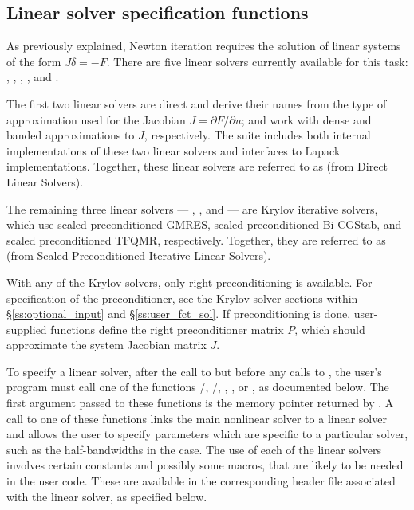 
\subsection{Linear solver specification functions}\label{sss:lin_solv_init}

As previously explained, Newton iteration requires the solution of
linear systems of the form $J\delta = -F$. There are five {\kinsol} linear
solvers currently available for this task: {\kindense}, {\kinband}, {\kinspgmr},
{\kinspbcg}, and {\kinsptfqmr}.

The first two linear solvers are direct and derive their names from the
type of approximation used for the Jacobian $J = \partial{F}/\partial{u}$;
{\kindense} and {\kinband} work with dense and banded approximations
to $J$, respectively.  The {\sundials} suite includes both internal
implementations of these two linear solvers and interfaces to Lapack
implementations.  Together, these linear solvers are referred to as
{\kindls} (from Direct Linear Solvers).

The remaining three {\kinsol} linear solvers --- {\kinspgmr}, {\kinspbcg},
and {\kinsptfqmr} --- are Krylov iterative solvers, which use scaled
preconditioned GMRES, scaled preconditioned Bi-CGStab, and scaled
preconditioned TFQMR, respectively.  Together, they are referred to as
{\kinspils} (from Scaled Preconditioned Iterative Linear Solvers).

With any of the Krylov solvers, only right preconditioning is available.
For specification of the preconditioner, see the Krylov solver sections
within \S\ref{ss:optional_input} and \S\ref{ss:user_fct_sol}.
If preconditioning is done, user-supplied functions define the right
preconditioner matrix $P$, which should approximate the system
Jacobian matrix $J$.

To specify a {\kinsol} linear solver, after the call to 
but before any calls to , the user's program must call one of
the functions /, /,
, , or , as documented below.
The first argument passed to these functions is the {\kinsol}
memory pointer returned by . A call to one of these
functions links the main {\kinsol} nonlinear solver to a linear solver and
allows the user to specify parameters which are specific to a
particular solver, such as the half-bandwidths in the {\kinband} case.
The use of each of the linear solvers involves certain constants and possibly 
some macros, that are likely to be needed in the user code.  These are
available in the corresponding header file associated with the linear
solver, as specified below.

